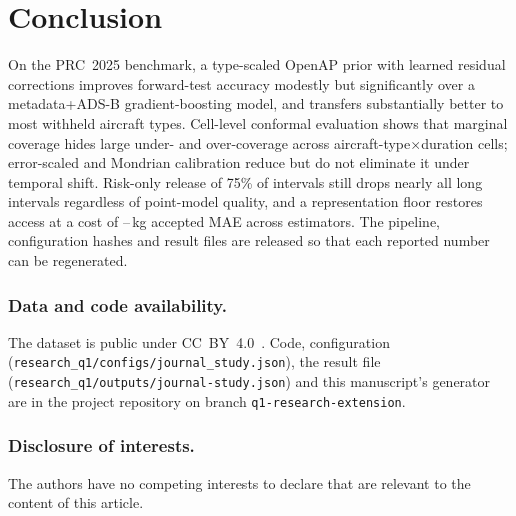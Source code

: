\documentclass[runningheads]{llncs}
\begin{document}
\section{Conclusion}
On the PRC~2025 benchmark, a type-scaled OpenAP prior with learned residual corrections improves forward-test accuracy modestly but significantly over a metadata+ADS-B gradient-boosting model, and transfers substantially better to most withheld aircraft types. Cell-level conformal evaluation shows that marginal coverage hides large under- and over-coverage across aircraft-type$\times$duration cells; error-scaled and Mondrian calibration reduce but do not eliminate it under temporal shift. Risk-only release of 75\% of intervals still drops nearly all long intervals regardless of point-model quality, and a representation floor restores access at a cost of \floorCostHgbResidualPhysics{}--\floorCostHgbMetadataAdsb{}\,kg accepted MAE across estimators. The pipeline, configuration hashes and result files are released so that each reported number can be regenerated.

\subsubsection{Data and code availability.}
The dataset is public under CC~BY~4.0~\cite{zenodo_prc2025}. Code, configuration (\texttt{research\_q1/configs/journal\_study.json}), the result file (\texttt{research\_q1/outputs/journal-study.json}) and this manuscript's generator are in the project repository on branch \texttt{q1-research-extension}.

\subsubsection{Disclosure of interests.}
The authors have no competing interests to declare that are relevant to the content of this article.



\end{document}

